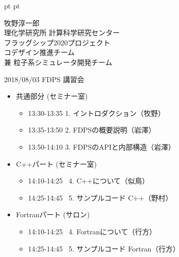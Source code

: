 \documentclass[12pt,dvipdfmx]{article}
\begin{document}
\LARGE

 pt
 pt

\date{}





{\large

\begin{center}
牧野淳一郎\\
理化学研究所 計算科学研究センター\\
フラッグシップ2020プロジェクト\\
コデザイン推進チーム\\
兼 粒子系シミュレータ開発チーム

\leavevmode


\end{center}

}

\vfill

\hfill 2018/08/03  FDPS 講習会
 



\begin{itemize}

\item 共通部分  (セミナー室)
\begin{itemize}
\item 13:30-13:35 1. イントロダクション（牧野）
\item 13:35-13:50 2. FDPSの概要説明（岩澤）
\item 13:50-14:10 3. FDPSのAPIと内部構造（岩澤）
\end{itemize}

\item  C++パート (セミナー室)
\begin{itemize}
\item 14:10-14:25  4. C++について（似鳥）
\item 14:25-14:45  5. サンプルコード C++（野村）
\end{itemize}

\item  Fortranパート (サロン)
\begin{itemize}
\item 14:10-14:25  4. Fortranについて（行方）
\item 14:25-14:45  5. サンプルコード Fortran（行方）
\end{itemize}
\end{itemize}
\end{document}
